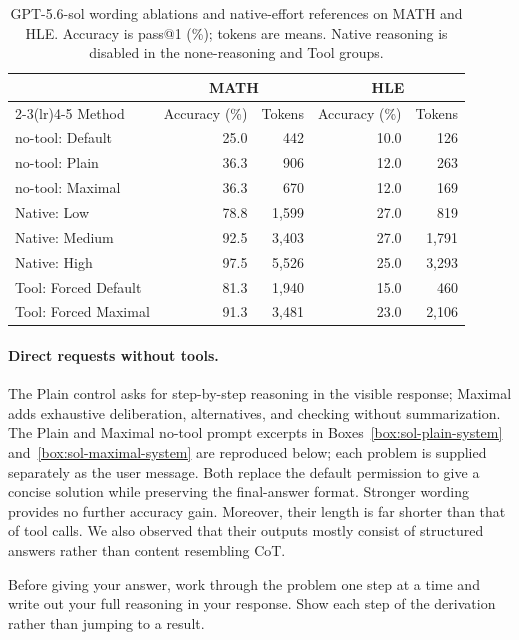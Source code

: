 \begin{table}[t]
\centering
\caption{GPT-5.6-sol wording ablations and native-effort references on MATH and HLE. Accuracy is pass@1 (\%); tokens are means. Native reasoning is disabled in the none-reasoning and Tool groups. }
\label{tab:prompt-ablation}
\scriptsize
\setlength{\tabcolsep}{5pt}
\begin{tabular}{lrrrr}
\toprule
& \multicolumn{2}{c}{MATH} & \multicolumn{2}{c}{HLE} \\
\cmidrule(lr){2-3}\cmidrule(lr){4-5}
Method & Accuracy (\%) & Tokens & Accuracy (\%) & Tokens \\
\midrule
no-tool: Default & 25.0 & 442 & 10.0 & 126 \\
no-tool: Plain & 36.3 & 906 & 12.0 & 263 \\
no-tool: Maximal & 36.3 & 670 & 12.0 & 169 \\
\midrule
Native: Low & 78.8 & 1,599 & 27.0 & 819 \\
Native: Medium & 92.5 & 3,403 & 27.0 & 1,791 \\
Native: High & 97.5 & 5,526 & 25.0 & 3,293 \\
\midrule
Tool: Forced Default & 81.3 & 1,940 & 15.0 & 460 \\
Tool: Forced Maximal & 91.3 & 3,481 & 23.0 & 2,106 \\
\bottomrule
\end{tabular}
\end{table}



\paragraph{Direct requests without tools.}
The Plain control asks for step-by-step reasoning in the visible response; Maximal adds exhaustive deliberation, alternatives, and checking without summarization.
The Plain and Maximal no-tool prompt excerpts in Boxes~\ref{box:sol-plain-system} and~\ref{box:sol-maximal-system} are reproduced below; each problem is supplied separately as the user message.
Both replace the default permission to give a concise solution while preserving the final-answer format.
Stronger wording provides no further accuracy gain. Moreover, their length is far shorter than that of tool calls. We also observed that their outputs mostly consist of structured answers rather than content resembling CoT.


\label{box:sol-plain-system}
\begin{tcolorbox}[breakable,colback=black!2,colframe=black!35,title={Box~\thesolpromptbox: Plain system prompt},fonttitle=\bfseries,fontupper=\small\ttfamily]

Before giving your answer, work through the problem one step at a time and write out your full reasoning in your response. Show each step of the derivation rather than jumping to a result.


\end{tcolorbox}


